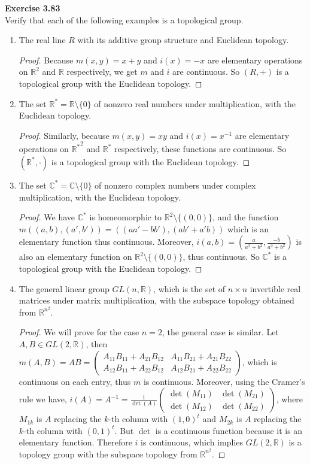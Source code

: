 \documentclass[12pt, a4paper]{article}
\theoremstyle{plain}
\newcommand{\R}{\mathbb{R}}
\newcommand{\C}{\mathbb{C}}
\newenvironment{exercise}[2][Exercise]
    { \begin{mdframed}[backgroundcolor=gray!20] \textbf{#1 #2} \\}
    {  \end{mdframed}}
\begin{document}
\begin{exercise}{3.83}
Verify that each of the following examples is a topological group.
\begin{enumerate}[label=(\alph*)]
\item The real line $R$ with its additive group structure and Euclidean topology.
	\begin{proof}
	Because $m(x,y)=x+y$ and $i(x)=-x$ are elementary operations on $\R^2$ and $\R$ respectively, we get $m$ and $i$ are continuous. So $(R,+)$ is a topological group with the Euclidean topology.
	\end{proof}

\item The set $\R^*=\R\setminus\{0\}$ of nonzero real numbers under multiplication, with the Euclidean topology.
	\begin{proof}
	Similarly, because $m(x,y)=xy$ and $i(x)=x^{-1}$ are elementary operations on ${\R^*}^2$ and $\R^*$ respectively, these functions are continuous. So $(\R^*,\cdot)$ is a topological group with the Euclidean topology.
	\end{proof}

\item The set $\C^*=\C\setminus\{0\}$ of nonzero complex numbers under complex multiplication, with the Euclidean topology.
	\begin{proof}
	We have $\C^*$ is homeomorphic to $\R^2\setminus\{(0,0)\}$, and the function $m((a,b),(a',b'))=((aa'-bb'),(ab'+a'b))$ which is an elementary function thus continuous. Moreover, $i(a,b)=\left(\frac{a}{a^2+b^2},\frac{-b}{a^2+b^2}\right)$ is also an elementary function on $\R^2\setminus\{(0,0)\}$, thus continuous. So $\C^*$ is a topological group with the Euclidean topology.
	\end{proof}

\item The general linear group $GL(n,\R)$, which is the set of $n\times n$ invertible real matrices under matrix multiplication, with the subspace topology obtained from $\R^{n^2}$.
	\begin{proof}
	We will prove for the case $n=2$, the general case is similar. Let $A,B\in GL(2,\R)$, then $m(A,B)=AB=\begin{pmatrix}
	A_{11}B_{11}+A_{21}B_{12} & A_{11}B_{21}+A_{21}B_{22}\\
	A_{12}B_{11}+A_{22}B_{12} & A_{12}B_{21}+A_{22}B_{22}
	\end{pmatrix}$, which is continuous on each entry, thus $m$ is continuous. Moreover, using the Cramer's rule we have, $i(A)=A^{-1}=\frac{1}{\det(A)}{\begin{pmatrix}
	\det(M_{11})&\det(M_{21})\\
	\det(M_{12})&\det(M_{22})
	\end{pmatrix}}$, where $M_{1k}$ is $A$ replacing the $k$-th column with $(1, 0)^t$ and $M_{2k}$ is $A$ replacing the $k$-th column with $(0, 1)^t$. But $\det$ is a continuous function because it is an elementary function. Therefore $i$ is continuous, which implies $GL(2,\R)$ is a topology group with the subspace topology from $\R^{n^2}$.
	\end{proof}


\end{enumerate}
\end{exercise}
\end{document}
